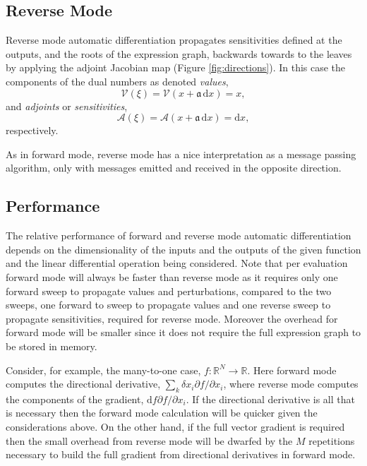 \subsection{Reverse Mode}

Reverse mode automatic differentiation propagates sensitivities defined at the outputs,
and the roots of the expression graph, backwards towards to the leaves by applying
the adjoint Jacobian map (Figure \ref{fig:directions}).  In this case the components of 
the dual numbers as denoted \textit{values},
%
\begin{equation*}
\mathcal{V} \! \left( \xi \right) 
= \mathcal{V} \! \left( x + \mathfrak{a} \, \mathrm{d} x \right) 
= x,
\end{equation*}
%
and \textit{adjoints} or \textit{sensitivities},
\begin{equation*}
\mathcal{A} \! \left( \xi \right) 
= \mathcal{A} \! \left( x + \mathfrak{a} \, \mathrm{d} x \right) 
= \mathrm{d} x,
\end{equation*}
%
respectively.

As in forward mode, reverse mode has a nice interpretation as a message passing
algorithm, only with messages emitted and received in the opposite direction.

\subsection{Performance}

The relative performance of forward and reverse mode automatic differentiation
depends on the dimensionality of the inputs and the outputs of the given function
and the linear differential operation being considered.  Note that per evaluation forward 
mode will always be faster than reverse mode as it requires only one forward sweep 
to propagate values and perturbations, compared to the two sweeps, one forward to 
sweep to propagate values and one reverse sweep to propagate sensitivities, required 
for reverse mode.  Moreover the overhead for forward mode will be smaller since it 
does not require the full expression graph to be stored in memory.

Consider, for example, the many-to-one case, $f : \mathbb{R}^{N} \rightarrow \mathbb{R}$.  
Here forward mode computes the directional derivative, $\sum_{k} \delta x_{i} \partial f / \partial x_{i}$,
where reverse mode computes the components of the gradient, $\mathrm{d} f \partial f / \partial x_{i}$.  
If the directional derivative is all that is necessary then the forward mode calculation 
will be quicker given the considerations above.  On the other hand, if the full vector gradient 
is required then the small overhead from reverse mode will be dwarfed by the $M$ repetitions 
necessary to build the full gradient from directional derivatives in forward mode.

